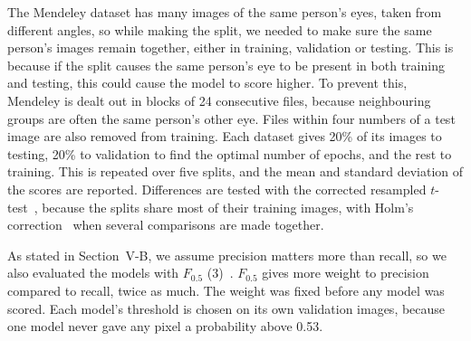 \documentclass[conference]{IEEEtran}
\begin{document}
The Mendeley dataset has many images of the same person's eyes, taken from
different angles, so while making the split, we needed to make sure the same
person's images remain together, either in training, validation or testing.
This is because if the split causes the same person's eye to be present in both
training and testing, this could cause the model to score higher. To prevent
this, Mendeley is dealt out in blocks of 24 consecutive files, because
neighbouring groups are often the same person's other eye. Files within four
numbers of a test image are also removed from training. Each dataset gives
20\% of its images to testing, 20\% to validation to find the optimal number of
epochs, and the rest to training. This is repeated over five splits, and the
mean and standard deviation of the scores are reported. Differences are tested
with the corrected resampled $t$-test~\cite{nadeau2003}, because the splits
share most of their training images, with Holm's correction~\cite{holm1979}
when several comparisons are made together.

As stated in Section~V-B, we assume precision matters more than recall, so we
also evaluated the models with $F_{0.5}$ (3)~\cite{vanrijsbergen1979}.
$F_{0.5}$ gives more weight to precision compared to recall, twice as much. The
weight was fixed before any model was scored. Each model's threshold is chosen
on its own validation images, because one model never gave any pixel a
probability above 0.53.
\end{document}

